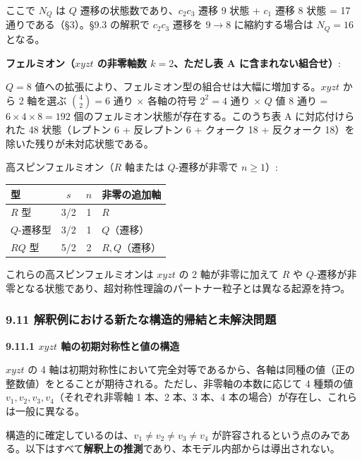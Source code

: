 \documentclass[
  a4paper,11pt]{ltjsarticle}
\newcounter{none}
\theoremstyle{definition}
\theoremstyle{remark}
\begin{document}
ここで \(N_Q\) は \(Q\) 遷移の状態数であり、\(c_2 c_3\) 遷移 9 状態 +
\(c_1\) 遷移 8 状態 = 17 通りである（§3）。§9.3 の解釈で \(c_2 c_3\)
遷移を \(9 \to 8\) に縮約する場合は \(N_Q = 16\) となる。

\textbf{フェルミオン（\(xyzt\) の非零軸数 \(k = 2\)、ただし表 A
に含まれない組合せ）}:

\(Q = 8\)
値への拡張により、フェルミオン型の組合せは大幅に増加する。\(xyzt\) から
2 軸を選ぶ \(\binom{4}{2} = 6\) 通り × 各軸の符号 \(2^2 = 4\) 通り ×
\(Q\) 値 8 通り = \(6 \times 4 \times 8 = 192\)
個のフェルミオン状態が存在する。このうち表 A に対応付けられた 48
状態（レプトン 6 + 反レプトン 6 + クォーク 18 + 反クォーク
18）を除いた残りが未対応状態である。

高スピンフェルミオン（\(R\) 軸または \(Q\)-遷移が非零で \(n \geq 1\)）:

{\def\LTcaptype{none} %
\begin{longtable}[]{@{}lccl@{}}
\toprule\noalign{}
型 & \(s\) & \(n\) & 非零の追加軸 \\
\midrule\noalign{}
\endhead
\bottomrule\noalign{}
\endlastfoot
\(R\) 型 & 3/2 & 1 & \(R\) \\
\(Q\)-遷移型 & 3/2 & 1 & \(Q\)（遷移） \\
\(RQ\) 型 & 5/2 & 2 & \(R, Q\)（遷移） \\
\end{longtable}
}

これらの高スピンフェルミオンは \(xyzt\) の 2 軸が非零に加えて \(R\) や
\(Q\)-遷移が非零となる状態であり、超対称性理論のパートナー粒子とは異なる起源を持つ。

\subsubsection{9.11
解釈例における新たな構造的帰結と未解決問題}\label{ux89e3ux91c8ux4f8bux306bux304aux3051ux308bux65b0ux305fux306aux69cbux9020ux7684ux5e30ux7d50ux3068ux672aux89e3ux6c7aux554fux984c}

\textbf{9.11.1 \(xyzt\) 軸の初期対称性と値の構造}

\(xyzt\) の 4
軸は初期対称性において完全対等であるから、各軸は同種の値（正の整数値）をとることが期待される。ただし、非零軸の本数に応じて
4 種類の値 \(v_1, v_2, v_3, v_4\)（それぞれ非零軸 1 本、2 本、3 本、4
本の場合）が存在し、これらは一般に異なる。

構造的に確定しているのは、\(v_1 \neq v_2 \neq v_3 \neq v_4\)
が許容されるという点のみである。以下はすべて\textbf{解釈上の推測}であり、本モデル内部からは導出されない。
\end{document}
